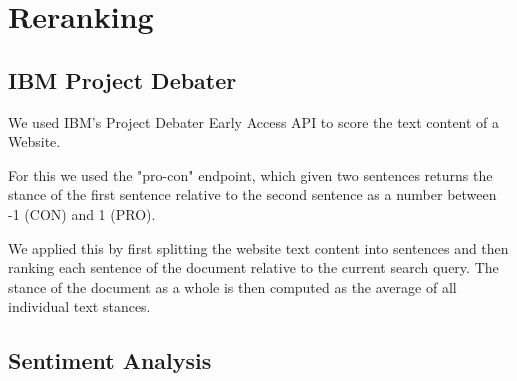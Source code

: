 \section{Reranking}

\subsection{IBM Project Debater}

We used IBM's Project Debater Early Access API to score the text content of a Website.

For this we used the "pro-con" endpoint, which given two sentences returns the stance of the first sentence relative to the second sentence as a number between -1 (CON) and 1 (PRO).

We applied this by first splitting the website text content into sentences and then ranking each sentence of the document relative to the current search query. The stance of the document as a whole is then computed as the average of all individual text stances.

\subsection{Sentiment Analysis}%
